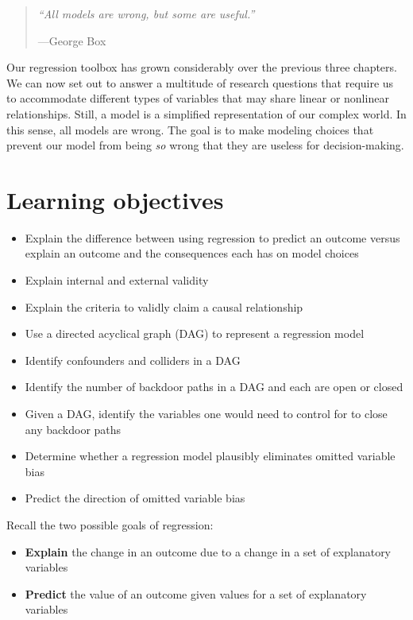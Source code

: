 \documentclass[
]{book}
\providecommand{\tightlist}{%
  \setlength{\itemsep}{0pt}\setlength{\parskip}{0pt}}
\begin{document}
\begin{quote}
\emph{``All models are wrong, but some are useful.''}

---George Box
\end{quote}

Our regression toolbox has grown considerably over the previous three chapters. We can now set out to answer a multitude of research questions that require us to accommodate different types of variables that may share linear or nonlinear relationships. Still, a model is a simplified representation of our complex world. In this sense, all models are wrong. The goal is to make modeling choices that prevent our model from being \emph{so} wrong that they are useless for decision-making.

\hypertarget{lo9}{%
\section{Learning objectives}\label{lo9}}

\begin{itemize}
\tightlist
\item
  Explain the difference between using regression to predict an outcome versus explain an outcome and the consequences each has on model choices
\item
  Explain internal and external validity
\item
  Explain the criteria to validly claim a causal relationship
\item
  Use a directed acyclical graph (DAG) to represent a regression model
\item
  Identify confounders and colliders in a DAG
\item
  Identify the number of backdoor paths in a DAG and each are open or closed
\item
  Given a DAG, identify the variables one would need to control for to close any backdoor paths
\item
  Determine whether a regression model plausibly eliminates omitted variable bias
\item
  Predict the direction of omitted variable bias
\end{itemize}

Recall the two possible goals of regression:

\begin{itemize}
\tightlist
\item
  \textbf{Explain} the change in an outcome due to a change in a set of explanatory variables
\item
  \textbf{Predict} the value of an outcome given values for a set of explanatory variables
\end{itemize}
\end{document}

